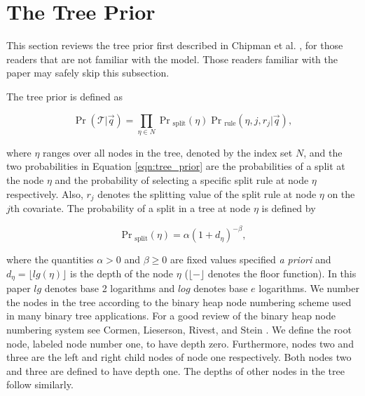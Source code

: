 \section{The Tree Prior}\label{subsec:the_tp}	
This section reviews the tree prior first described in Chipman et al. \cite{chipman1998bayesian}, for those readers that are not familiar with the model. Those readers familiar with the paper may safely skip this subsection. 

The tree prior is defined as

\begin{equation} \label{eqn:tree_prior}
\Pr(\mathcal{T}\vert \vec{q}) = \prod_{\eta\in N} \Pr{_{\text{split}}} (\eta) \Pr{_{\text{rule}}}(\eta,j,r_j \vert \vec{q} ),
\end{equation}

\noindent where $\eta$ ranges over all nodes in the tree, denoted by the index set $N$, and the two probabilities in Equation \ref{eqn:tree_prior} are the probabilities of a split at the node $\eta$ and the probability of selecting a specific split rule at node $\eta$ respectively. Also, $r_j$ denotes the splitting value of the split rule at node $\eta$ on the $j$th covariate. The probability of a split in a tree at node $\eta$ is defined by 
 
 \begin{equation}\label{eqn:psplit}
 \Pr{_\text{split}}(\eta)= \alpha(1+d_\eta)^{-\beta},
 \end{equation}
 
\noindent where the quantities $\alpha>0$ and $\beta\geq0$ are fixed values specified \emph{a priori} and $d_\eta = \lfloor lg(\eta)\rfloor$ is the depth of the node $\eta$ ($\lfloor - \rfloor$ denotes the floor function). In this paper $lg$ denotes base 2 logarithms and $log$ denotes base $e$ logarithms. We number the nodes in the tree according to the binary heap node numbering scheme used in many binary tree applications. For a good review of the binary heap node numbering system see Cormen, Lieserson, Rivest, and Stein \cite{cormen2001introduction}. We define the root node, labeled node number one, to have depth zero. Furthermore,  nodes two and three are the left and right child nodes of node one respectively. Both nodes two and three are defined to have depth one. The depths of other nodes in the tree follow similarly.   

